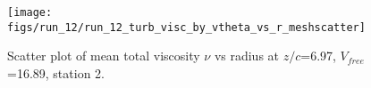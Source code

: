 \begin{figure}[H]
\centering
\texttt{[image: figs/run\_12/run\_12\_turb\_visc\_by\_vtheta\_vs\_r\_meshscatter]}
\caption{Scatter plot of mean total viscosity $\nu$ vs radius at $z/c$=6.97, $V_{free}$=16.89, station 2.}
\label{fig:run_12_turb_visc_by_vtheta_vs_r_meshscatter}
\end{figure}


